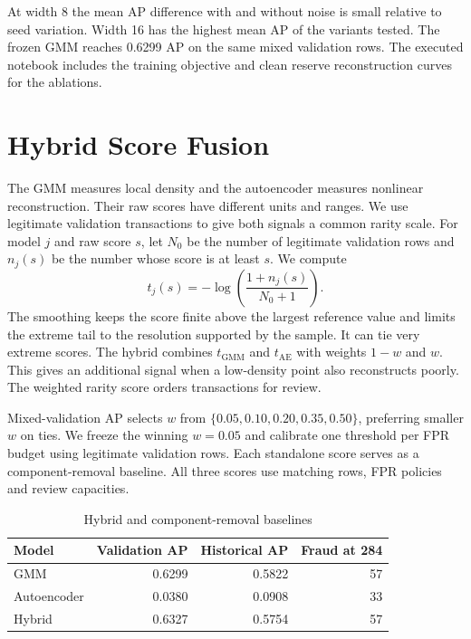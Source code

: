 \documentclass[conference]{IEEEtran}
\begin{document}
At width 8 the mean AP difference with and without noise is small relative to seed variation. Width 16 has the highest mean AP of the variants tested. The frozen GMM reaches 0.6299 AP on the same mixed validation rows. The executed notebook includes the training objective and clean reserve reconstruction curves for the ablations.

\section{Hybrid Score Fusion}
The GMM measures local density and the autoencoder measures nonlinear reconstruction. Their raw scores have different units and ranges. We use legitimate validation transactions to give both signals a common rarity scale. For model $j$ and raw score $s$, let $N_0$ be the number of legitimate validation rows and $n_j(s)$ be the number whose score is at least $s$. We compute
\begin{equation}
t_j(s)=-\log\left(\frac{1+n_j(s)}{N_0+1}\right).
\end{equation}
The smoothing keeps the score finite above the largest reference value and limits the extreme tail to the resolution supported by the sample. It can tie very extreme scores. The hybrid combines $t_{\mathrm{GMM}}$ and $t_{\mathrm{AE}}$ with weights $1-w$ and $w$. This gives an additional signal when a low-density point also reconstructs poorly. The weighted rarity score orders transactions for review.

Mixed-validation AP selects $w$ from $\{0.05,0.10,0.20,0.35,0.50\}$, preferring smaller $w$ on ties. We freeze the winning $w=0.05$ and calibrate one threshold per FPR budget using legitimate validation rows. Each standalone score serves as a component-removal baseline. All three scores use matching rows, FPR policies and review capacities.

\begin{table}[t]\centering
\caption{Hybrid and component-removal baselines}
\label{tab:hybrid}
\begin{tabular}{lrrr}
\toprule
Model & Validation AP & Historical AP & Fraud at 284 \\
\midrule
GMM & 0.6299 & 0.5822 & 57 \\
Autoencoder & 0.0380 & 0.0908 & 33 \\
Hybrid & 0.6327 & 0.5754 & 57 \\
\bottomrule
\end{tabular}
\end{table}
\end{document}

